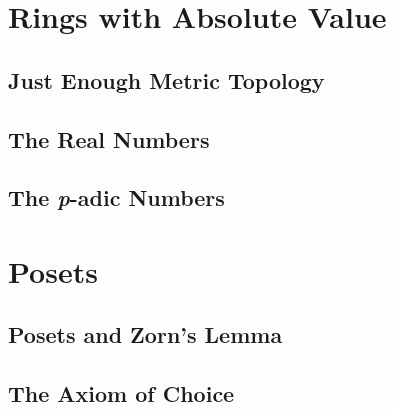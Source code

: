 \documentclass{memoir}
\begin{document}
\setcounter{dummycounter}{\value{section}}%
\appendix
\setcounter{section}{\value{dummycounter}}%

  \chapter{Rings with Absolute Value}
    \label{chap:abs-val}
    
    \newpage

    \section{Just Enough Metric Topology}
      \label{sec:ring-with-abs-val}
      
      \newpage

    \section{The Real Numbers}
      \label{sec:reals}
      
      \newpage

    \section{The \emph{p}-adic Numbers}

  \chapter{Posets}
    \newpage

    \section{Posets and Zorn's Lemma}
      \label{sec:zorn}
      
      \newpage

    \section{The Axiom of Choice}


\backmatter
  \printindex
\end{document}
